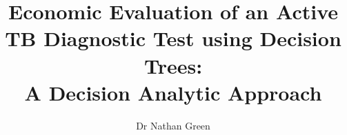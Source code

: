 \documentclass[t]{beamer}
\author{Dr Nathan Green}
\title[Decision analytic modelling for economic evaluation]{Economic Evaluation of an Active TB Diagnostic Test using Decision Trees:\\ A Decision Analytic Approach}
\begin{document}
\frame{\maketitle}




%
\end{document}
